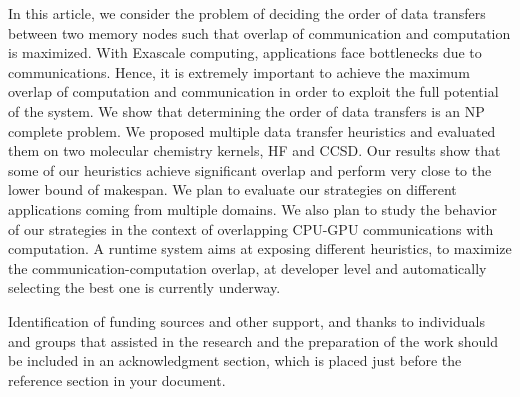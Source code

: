 \documentclass[sigconf]{acmart}
\begin{document}
In this article, we consider the problem of deciding the order of data transfers between two memory nodes such that overlap of communication and  computation is maximized. With Exascale computing, applications face bottlenecks due to communications. Hence, it is extremely important to achieve the maximum overlap of computation and communication in order to exploit the full potential of the system. We show that determining the order of data transfers is an NP complete problem. We proposed multiple data transfer heuristics and evaluated them on two molecular chemistry kernels, HF and CCSD. Our results show that some of our heuristics achieve significant overlap and perform very close to the lower bound of makespan. We plan to evaluate our strategies on different applications coming from multiple domains. We also plan to study the behavior of our strategies in the context of overlapping CPU-GPU communications with computation. A runtime system aims at exposing different heuristics, to maximize the communication-computation overlap, at developer level and automatically selecting the best one is currently underway.


\begin{acks}
Identification of funding sources and other support, and thanks to individuals and groups that assisted in the research and the preparation of the work should be included in an acknowledgment section, which is placed just before the reference section in your document. 

\end{acks}




%


\end{document}
